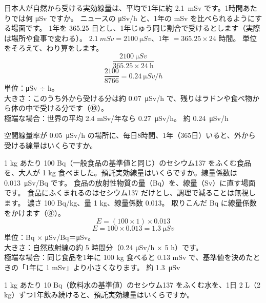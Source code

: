 \label{ph:原-14:ex7}
\begin{phreidai}
日本人が自然から受ける実効線量は、平均で1年に約 \qty{2.1}{mSv} です。1時間あたりでは何 \si{\micro Sv} ですか。
\phbamen
ニュースの \si{\micro Sv/h} と、1年の mSv を比べられるようにする場面です。
\phmushi
1年を 365.25 日とし、1年じゅう同じ割合で受けるとします（実際は場所や食事で変わる）。
\phzu
$\qty{2.1}{mSv}=\qty{2100}{\micro Sv}$、1年 $=365.25\times24$ 時間。
\phriyu
単位をそろえて、わり算をします。
\phtateru
\[ \frac{\qty{2100}{\micro Sv}}{365.25\times24\ \text{h}} \]
\phtoku
\[ \frac{2100}{8766}=\qty{0.24}{\micro Sv/h} \]
\phtashikame
単位：\si{\micro Sv} ÷ h。\\
大きさ：このうち外から受ける分は約 \qty{0.07}{\micro Sv/h} で、残りはラドンや食べ物から体の中で受ける分です（⑩）。\\
極端な場合：世界の平均 2.4 mSv/年なら \qty{0.27}{\micro Sv/h}。
\kotae 約 \qty{0.24}{\micro Sv/h}
\end{phreidai}
\begin{jibun}
空間線量率が \qty{0.05}{\micro Sv/h} の場所に、毎日8時間、1年（365日）いると、外から受ける線量はいくらですか。
\end{jibun}

\label{ph:原-14:ex8}
\begin{phreidai}[食品からの内部被ばく]
1 kg あたり 100 Bq（一般食品の基準値と同じ）のセシウム137 をふくむ食品を、大人が 1 kg 食べました。預託実効線量はいくらですか。線量係数は \qty{0.013}{\micro Sv}/Bq です。
\phbamen
食品の放射性物質の量（Bq）を、線量（Sv）に直す場面です。
\phmushi
食品にふくまれるのはセシウム137 だけとし、調理で減ることは無視します。
\phzu
濃さ 100 Bq/kg、量 1 kg、線量係数 0.013。
\phriyu
取りこんだ Bq に線量係数をかけます（⑧）。
\phtateru
\[ E=(100\times1)\times0.013 \]
\phtoku
\[ E=100\times0.013=\qty{1.3}{\micro Sv} \]
\phtashikame
単位：Bq × \si{\micro Sv}/Bq＝\si{\micro Sv}。\\
大きさ：自然放射線の約 5 時間分（0.24 \si{\micro Sv/h} × 5 h）です。\\
極端な場合：同じ食品を1年に 100 kg 食べると 0.13 mSv で、基準値を決めたときの「1年に 1 mSv」より小さくなります。
\kotae 約 \qty{1.3}{\micro Sv}
\end{phreidai}
\begin{jibun}
1 kg あたり 10 Bq（飲料水の基準値）のセシウム137 をふくむ水を、1日 2 L（2 kg）ずつ1年飲み続けると、預託実効線量はいくらですか。
\end{jibun}

